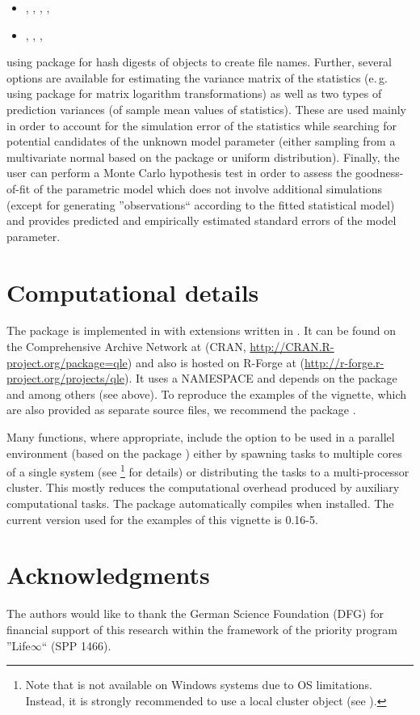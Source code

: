 \documentclass[article, nojss]{jss}
\numberwithin{equation}{section}			%
\begin{document}
\begin{itemize}
 \item[] , , , ,
 \item[] , , , 
\end{itemize}
using package  \citep{pkg:digest} for hash digests of 
objects to create file names. Further, several options are available for
estimating the variance matrix of the statistics (e.\,g. using package  \citep{pkg:expm}
for matrix logarithm transformations) as well as two types of prediction
variances (of sample mean values of statistics). These are used mainly in order to account for the
simulation error of the statistics while searching for potential candidates of the
unknown model parameter (either sampling from a multivariate normal based on the
package  \citep{pkg:mvtnorm} or uniform distribution).
Finally, the user can perform a Monte Carlo hypothesis test in order to assess
the goodness-of-fit of the parametric model which does not involve additional simulations
(except for generating ''observations`` according to the fitted statistical model) and provides
predicted and empirically estimated standard errors of the model parameter.\par
%
\section{Computational details}
The package  is implemented in  with extensions written in
. It can be found on the Comprehensive  Archive
Network at (CRAN, \url{http://CRAN.R-project.org/package=qle}) and also is hosted on
R-Forge at (\url{http://r-forge.r-project.org/projects/qle}). It uses a
NAMESPACE and depends on the package  \citep{pkg:stats} and
 \citep{pkg:nloptr} among others (see above). To reproduce the
examples of the vignette, which are also provided as separate 
source files, we recommend the package .\par
%
Many functions, where appropriate, include the option to be used in a parallel
environment (based on the package ) either by spawning tasks to multiple
cores of a single system (see \footnote{Note that 
is not available on Windows systems due to OS limitations.
Instead, it is strongly recommended to use a local cluster object (see
).} for details) or distributing the tasks to a
multi-processor cluster. This mostly reduces the computational overhead produced by auxiliary
computational tasks. The package  automatically compiles when
installed. The current version used for the examples of this vignette is 0.16-5.
%
\section*{Acknowledgments}
The authors would like to thank the German Science Foundation (DFG) for financial support of
this research within the framework of the priority program ''Life$\infty$``
(SPP 1466).
%

\end{document}
